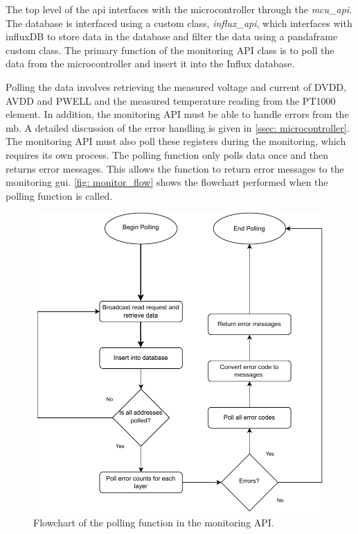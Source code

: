 \documentclass[main.tex]{subfiles}
\begin{document}
The top level of the \gls{api} interfaces with the microcontroller through the \textit{mcu\_api}. The database is interfaced using a custom class, \textit{influx\_api}, which interfaces with influxDB to store data in the database and filter the data using a pandaframe custom class. The primary function of the monitoring API class is to poll the data from the microcontroller and insert it into the Influx database. 

Polling the data involves retrieving the measured voltage and current of DVDD, AVDD and PWELL and the measured temperature reading from the PT1000 element. In addition, the monitoring API must be able to handle errors from the \gls{mb}. A detailed discussion of the error handling is given in \autoref{ssec: microcontroller}. The monitoring API must also poll these registers during the monitoring, which requires its own process. The polling function only polls data once and then returns error messages. This allows the function to return error messages to the monitoring \gls{gui}. \autoref{fig: monitor_flow} shows the flowchart performed when the polling function is called.

\begin{figure}[!ht]
    \centering
    \includegraphics[scale=0.9]{images/Monitoring Flowchart.pdf}
    \caption{Flowchart of the polling function in the monitoring API.}
    \label{fig: monitor_flow}
\end{figure}
\FloatBarrier
\end{document}
